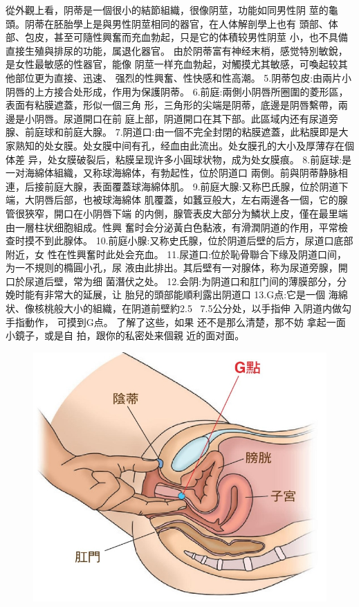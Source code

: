 \documentclass[12pt,UTF8]{ctexbook}
\begin{document}
從外觀上看，阴蒂是一個很小的結節組織，很像阴莖，功能如同男性阴
莖的龜頭。阴蒂在胚胎學上是與男性阴莖相同的器官，在人体解剖學上也有
頭部、体部、包皮，甚至可隨性興奮而充血勃起，只是它的体積较男性阴莖
小，也不具備直接生殖與排尿的功能，属退化器官。
由於阴蒂富有神经末梢，感觉特別敏銳，是女性最敏感的性器官，能像
阴莖一样充血勃起，对觸摸尤其敏感，可喚起较其他部位更为直接、迅速、
强烈的性興奮、性快感和性高潮。
5.阴蒂包皮:由兩片小阴唇的上方接合处形成，作用为保護阴蒂。
6.前庭:兩側小阴唇所圈圍的菱形區，表面有粘膜遮蓋，形似一個三角
形，三角形的尖端是阴蒂，底邊是阴唇繫帶，兩邊是小阴唇。尿道開口在前
庭上部，阴道開口在其下部。此區域内还有尿道旁腺、前庭球和前庭大腺。
7.阴道口:由一個不完全封閉的粘膜遮蓋，此粘膜即是大家熟知的处女膜。处女膜中间有孔，经血由此流出。处女膜孔的大小及厚薄存在個体差
异，处女膜破裂后，粘膜呈现许多小圓球状物，成为处女膜痕。
8.前庭球:是一对海綿体組織，又称球海綿体，有勃起性，位於阴道口
兩側。前與阴蒂静脉相連，后接前庭大腺，表面覆蓋球海綿体肌。
9.前庭大腺:又称巴氏腺，位於阴道下端，大阴唇后部，也被球海綿体
肌覆蓋，如蠶豆般大，左右兩邊各一個，它的腺管很狹窄，開口在小阴唇下端
的内側，腺管表皮大部分为鱗状上皮，僅在最里端由一層柱状细胞組成。性興
奮时会分泌黃白色黏液，有滑潤阴道的作用，平常檢查时摸不到此腺体。
10.前庭小腺:又称史氏腺，位於阴道后壁的后方，尿道口底部附近，女
性在性興奮时此处会充血。
11.尿道口:位於恥骨聯合下缘及阴道口间，为一不規则的橢圓小孔，尿
液由此排出。其后壁有一对腺体，称为尿道旁腺，開口於尿道后壁，常为细
菌潛伏之处。
12.会阴:为阴道口和肛门间的薄膜部分，分娩时能有非常大的延展，让
胎兒的頭部能順利露出阴道口
13.G点:它是一個
海綿状、像核桃般大小的組織，在阴道前壁約2.5
~7.5公分处，以手指伸
入阴道内做勾手指動作，
可摸到G点。
了解了这些，如果
还不是那么清楚，那不妨
拿起一面小鏡子，或是自
拍，跟你的私密处来個親
近的面对面。

\begin{figure}[htbp]
	\centering
	\includegraphics[width=0.7\linewidth]{8}
	\caption{}
	\label{fig:1}
\end{figure}
\end{document}
